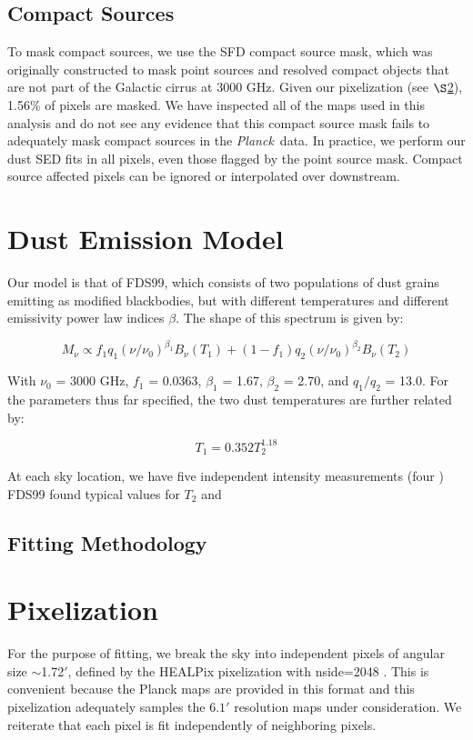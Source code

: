 \documentclass{emulateapj}
\newcommand{\PLANCK}{{\it Planck}}
\begin{document}
\subsection{Compact Sources}
To mask compact sources, we use the SFD compact source mask, which was 
originally constructed to mask point sources and resolved compact objects
that are not part of the Galactic cirrus at 3000 GHz. Given our pixelization 
(see $\S$\ref{sec:pix}), 1.56\% of pixels are masked. We have inspected all of 
the maps used in this analysis and do not see any evidence that this compact 
source mask fails to adequately mask compact sources in the \PLANCK~data. In 
practice, we perform our dust SED fits in all pixels, even those flagged by 
the point source mask. Compact source affected pixels can be ignored or 
interpolated over downstream.


\section{Dust Emission Model}
\label{sec:modeling}
Our model is that of FDS99, which consists of two populations of dust 
grains emitting as modified blackbodies, but with different temperatures
and different emissivity power law indices $\beta$. The shape of this spectrum 
is given by:

\begin{equation}
M_{\nu} \propto f_{1}q_{1}(\nu/\nu_{0})^{\beta_1}B_{\nu}(T_1) + (1-f_{1})q_{2}(\nu/\nu_0)^{\beta_2}B_{\nu}(T_2)
\end{equation}

With $\nu_0$ = 3000 GHz, $f_{1}$ = 0.0363, $\beta_1$ = 1.67, $\beta_2$ = 2.70, 
and $q_1/q_2$ = 13.0. For the parameters thus far specified, the two dust 
temperatures are further related by:

\begin{equation}
T_1 = 0.352T_2^{1.18}
\end{equation}

At each sky location, we have five independent intensity measurements (four ) 
FDS99 found typical values for $T_2$ and 

\subsection{Fitting Methodology}

\section{Pixelization}
\label{sec:pix}
For the purpose of fitting, we break the sky into independent pixels of 
angular size $\sim$1.72$'$, defined by the HEALPix pixelization with nside=2048
\citep{healpix}. This is convenient because the Planck maps are provided in 
this format and this pixelization adequately samples the $6.1'$ resolution maps
under consideration. We reiterate that each pixel is fit independently of 
neighboring pixels.
\end{document}

